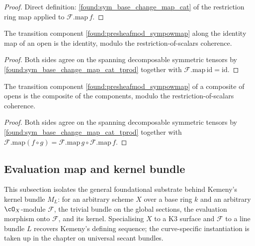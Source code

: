 \begin{proof}
  \leanok
  Direct definition: \cref{found:sym_base_change_map_cat} of the restriction ring map
  applied to \(\mathcal F.\mathrm{map}\,f\).
\end{proof}

\begin{lemma}
  \label{found:presheafmod_sympowmap_id}
  The transition component \cref{found:presheafmod_sympowmap} along the identity map
  of an open is the identity, modulo the restriction-of-scalars coherence.
\end{lemma}

\begin{proof}
  \leanok
  Both sides agree on the spanning decomposable symmetric tensors by
  \cref{found:sym_base_change_map_cat_tprod} together with
  \(\mathcal F.\mathrm{map}\,\mathrm{id}=\mathrm{id}\).
\end{proof}

\begin{lemma}
  \label{found:presheafmod_sympowmap_comp}
  The transition component \cref{found:presheafmod_sympowmap} of a composite of opens
  is the composite of the components, modulo the restriction-of-scalars coherence.
\end{lemma}

\begin{proof}
  \leanok
  Both sides agree on the spanning decomposable symmetric tensors by
  \cref{found:sym_base_change_map_cat_tprod} together with
  \(\mathcal F.\mathrm{map}(f\circ g)=\mathcal F.\mathrm{map}\,g\circ\mathcal F.\mathrm{map}\,f\).
\end{proof}

\subsection{Evaluation map and kernel bundle}

This subsection isolates the general foundational substrate behind Kemeny's kernel
bundle \(M_L\): for an arbitrary scheme \(X\) over a base ring \(k\) and an arbitrary
\(\cO_X\)-module \(\mathcal F\), the trivial bundle on the global sections, the
evaluation morphism onto \(\mathcal F\), and its kernel.  Specialising \(X\) to a K3
surface and \(\mathcal F\) to a line bundle \(L\) recovers Kemeny's defining sequence;
the curve-specific instantiation is taken up in the chapter on universal secant bundles.


